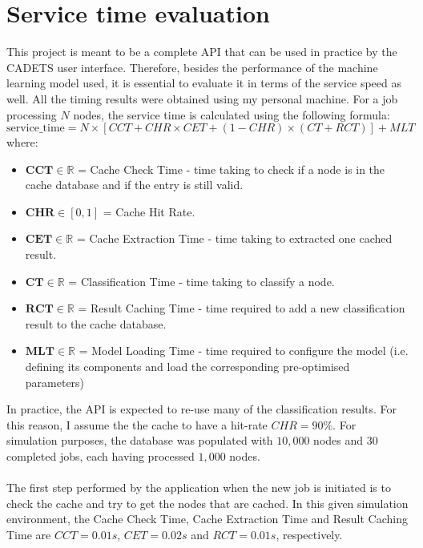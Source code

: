 		\section{Service time evaluation} \label{Section: eval/service-time}
			This project is meant to be a complete API that can be used in practice by the CADETS user interface. Therefore, besides the performance of the machine learning model used, it is essential to evaluate it in terms of the service speed as well. All the timing results were obtained using my personal machine. For a job processing $N$ nodes, the service time is calculated using the following formula:  
			\begin{equation}
				\text{service\_time} = N\times [CCT + CHR \times CET + (1-CHR) \times (CT + RCT)] + MLT
				\label{Eq: eval/service-time/overall}
			\end{equation}
			where: 
			\begin{itemize}
				\item $\mathbf{CCT} \in \mathbb{R}$ = Cache Check Time - time taking to check if a node is in the cache database and if the entry is still valid.
				\item $\mathbf{CHR} \in [0, 1]$ = Cache Hit Rate.
				\item $\textbf{CET} \in \mathbb{R}$ = Cache Extraction Time - time taking to extracted one cached result.
				\item $\textbf{CT} \in \mathbb{R}$ = Classification Time - time taking to classify a node. 
				\item $\textbf{RCT} \in \mathbb{R}$ = Result Caching Time - time required to add a new classification result to the cache database.
				\item $\mathbf{MLT} \in \mathbb{R}$ = Model Loading Time - time required to configure the model (i.e. defining its components and load the corresponding pre-optimised parameters)
			\end{itemize}
			In practice, the API is expected to re-use many of the classification results. For this reason, I assume the the cache to have a hit-rate $CHR = 90\%$. For simulation purposes, the database was populated with $10, 000$ nodes and $30$ completed jobs, each having processed $1, 000$ nodes. 
			\\ \\
			The first step performed by the application when the new job is initiated is to check the cache and try to get the nodes that are cached. In this given simulation environment, the Cache Check Time, Cache Extraction Time and Result Caching Time are $CCT=0.01s$, $CET=0.02s$ and $RCT=0.01s$, respectively.  
			
